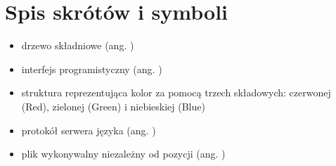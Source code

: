 \chapter{Spis skrótów i symboli}

\begin{itemize}
\item[AST] drzewo składniowe (ang. )
\item[API] interfejs programistyczny (ang. )
\item[RGB] struktura reprezentująca kolor za pomocą trzech składowych: czerwonej (Red), zielonej (Green) i niebieskiej (Blue)
\item[LSP] protokół serwera języka (ang. )
\item[PIE] plik wykonywalny niezależny od pozycji (ang. )
\end{itemize}
